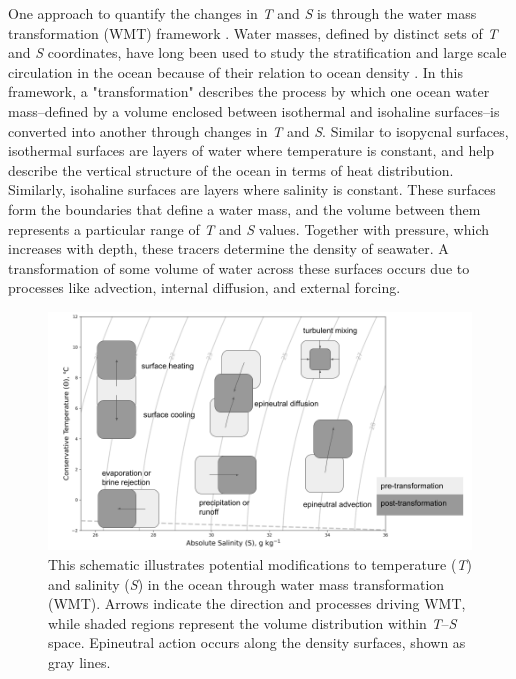 \documentclass[draft]{agujournal2019}
\begin{document}
 
One approach to quantify the changes in \emph{T} and \emph{S} is through the water mass transformation (WMT) framework \cite{Walin_1977,Walin1982}. Water masses, defined by distinct sets of \emph{T} and \emph{S} coordinates, have long been used to study the stratification and large scale circulation in the ocean because of their relation to ocean density \cite{sverdrup1942}. In this framework, a "transformation" describes the process by which one ocean water mass--defined by a volume enclosed between isothermal and isohaline surfaces--is converted into another through changes in \emph{T} and \emph{S}. Similar to isopycnal surfaces, isothermal surfaces are layers of water where temperature is constant, and help describe the vertical structure of the ocean in terms of heat distribution. Similarly, isohaline surfaces are layers where salinity is constant. These surfaces form the boundaries that define a water mass, and the volume between them represents a particular range of \emph{T} and \emph{S} values. Together with pressure, which increases with depth, these tracers determine the density of seawater. A transformation of some volume of water across these surfaces occurs due to processes like advection, internal diffusion, and external forcing.

\begin{figure}
    \includegraphics[width=\linewidth]{figs/TS_example.png}
    \vspace{-5pt} %
    \caption{This schematic illustrates potential modifications to temperature (\emph{T}) and salinity (\emph{S}) in the ocean through water mass transformation (WMT). Arrows indicate the direction and processes driving WMT, while shaded regions represent the volume distribution within \emph{T}--\emph{S} space. Epineutral action occurs along the density surfaces, shown as gray lines.}
    \label{fig:TS_example}
    \vspace{-20pt}
\end{figure}
\end{document}
